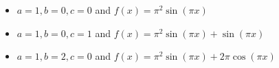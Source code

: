 \documentclass{beamer}
\begin{document}
\begin{frame}
    \begin{figure}
    \centering
    \begin{subfigure}[b]{0.45\textwidth}
        \centering
    \end{subfigure}
    \begin{subfigure}[b]{0.45\textwidth}
        \centering
    \end{subfigure}
    \end{figure}

    \begin{itemize}
        \item $a = 1, b = 0, c = 0$ and $f(x) = \pi^2\sin{(\pi x)}$
        \item $a = 1, b = 0, c = 1$ and $f(x) = \pi^2\sin{(\pi x)} + \sin{(\pi x)}$
        \item $a = 1, b = 2, c= 0$ and $f(x) = \pi^2\sin{(\pi x)} + 2\pi\cos{(\pi x)}$
    \end{itemize}
\end{frame}
\end{document}
